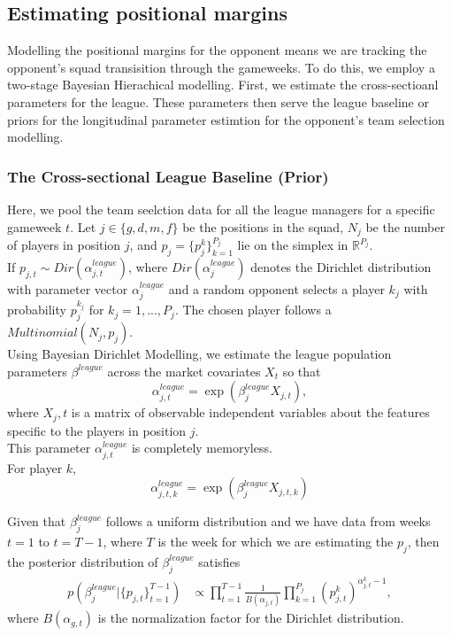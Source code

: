 			\subsection{Estimating positional margins}
				Modelling the positional margins for the opponent means we are tracking the opponent's squad transisition through the gameweeks. To do this, we employ a two-stage Bayesian Hierachical modelling.
				First, we estimate the cross-sectioanl parameters for the league. These parameters then serve the league baseline or priors for the longitudinal parameter estimtion for the opponent's team selection modelling.

				\subsubsection{The Cross-sectional League Baseline (Prior)}
				Here, we pool the team seelction data for all the league managers for a specific gameweek $t$. Let $j \in \{g,d,m,f\}$ be the positions in the squad, $N_j$ be the number of players in position $j$, and $p_j = \{p_j^k\}_{k=1}^{P_j}$ lie on the simplex in $\mathbb{R}^{P_j}$.\\
				If $p_{j,t} \sim Dir(\alpha^{league}_{j,t})$, where $Dir (\alpha^{league}_j)$ denotes the Dirichlet distribution with parameter vector $\alpha^{league}_j$ and a random opponent selects a player $k_j$ with probability $p_j^{k_j}$ for $k_j = 1, ..., P_j$. The chosen player follows a $Multinomial(N_j, p_j)$.\\
				Using Bayesian Dirichlet Modelling, we estimate the league population parameters $\beta^{league}$ across the market covariates  $X_t$ so that
				\begin{equation}\label{eq:alpha_league}
					\alpha_{j,t}^{league} = \exp\left(\beta_{j}^{league} X_{j,t} \right),
				\end{equation}
				where $X_j,t$ is a matrix of observable independent variables about the features specific to the players in position $j$.\\
				This parameter $\alpha_{j,t}^{league}$ is completely memoryless.\\
				For player $k$, $$ \alpha_{j,t, k}^{league} = \exp\left(\beta_{j}^{league} X_{j,t, k} \right)$$

				\begin{thm}
					Given that $\beta^{league}_{j}$ follows a uniform distribution and we have data from weeks $t=1$ to $t=T-1$, where $T$ is the week for which we are estimating the $p_j$, then the posterior distribution of $\beta_j^{league}$ satisfies
					\begin{equation}\label{Eq:beta_league}
						\begin{aligned}
							p(\beta_j^{league} | \{ p_{j,t}\}_{t=1}^{T-1})
							& \propto \prod_{t=1}^{T-1} \frac{1}{B(\alpha_{j,t})} \prod_{k=1}^{P_j}(p_{j,t}^k)^{\alpha_{j,t}^k-1},
						\end{aligned}
					\end{equation} where $B(\alpha_{g,t})$ is the normalization factor for the Dirichlet distribution.
				\end{thm}


